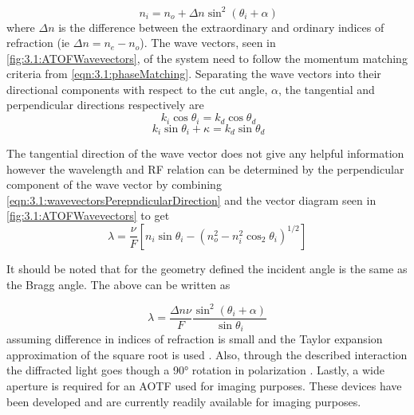 \documentclass[12pt]{article}
\begin{document}
 \begin{equation}
    \ n_{i} = n_{o} + \Delta n\sin^{2}(\theta_{i}+\alpha)
    \label{eqn:3.1:incomingIndexOfRefractionApprox}
\end{equation}
where $\Delta n$ is the difference between the extraordinary and ordinary indices of refraction (ie $\Delta n = n_{e} - n_{o}$). The wave vectors, seen in \autoref{fig:3.1:ATOFWavevectors}, of the system need to follow the momentum matching criteria from \autoref{eqn:3.1:phaseMatching}. Separating the wave vectors into their directional components with respect to the cut angle, $\alpha$, the tangential and perpendicular directions respectively are
\begin{equation}
    \ k_{i}\cos\theta_{i} = {k}_{d}\cos\theta_{d}
    \label{eqn:3.1:wavevectorsTangentalDirection}
\end{equation}
\begin{equation}
    \ k_{i}\sin\theta_{i} + \kappa = {k}_{d}\sin\theta_{d}
    \label{eqn:3.1:wavevectorsPerepndicularDirection}
\end{equation}

The tangential direction of the wave vector does not give any helpful information however the wavelength and RF relation can be determined by the perpendicular component of the wave vector by combining \autoref{eqn:3.1:wavevectorsPerepndicularDirection} and the vector diagram seen in \autoref{fig:3.1:ATOFWavevectors} to get
\begin{equation}
    \lambda  = \frac{\nu}{F}[n_{i}\sin\theta_{i}-(n_{o}^{2}-n_{i}^{2}\cos_{2}\theta_{i})^{1/2}]
    \label{eqn:3.1:initialAOTFWavelengthDependance}
\end{equation}

It should be noted that for the geometry defined the incident angle is the same as the Bragg angle. The above can be written as

\begin{equation}
    \lambda  = \frac{\Delta n\nu}{F}\frac{\sin^{2}(\theta_{i}+\alpha)}{\sin\theta_{i}}
    \label{eqn:3.1:AOTFWavelengthDependance}
\end{equation}
assuming difference in indices of refraction is small and the Taylor expansion approximation of the square root is used \citep{Voloshinov2006}. Also, through the described interaction the diffracted light goes though a 90\si{\degree} rotation in polarization \citep{Voloshinov1996}. Lastly, a wide aperture is required for an AOTF used for imaging purposes. These devices have been developed \citep{Gass1991} and are currently readily available for imaging purposes.
\end{document}
